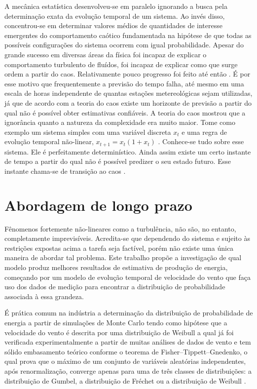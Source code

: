 \documentclass[
	12pt,				%
	openright,			%
	oneside,			%
	a4paper,			%
	english,			%
	french,				%
	spanish,			%
	brazil				%
	]{abntex2}
\begin{document}
A mecânica estatística desenvolveu-se em paralelo ignorando a busca pela determinação exata da evolução temporal de um sistema. Ao invés disso, concentrou-se em determinar valores médios de quantidades de interesse emergentes do comportamento caótico fundamentada na hipótese de que todas as possíveis configurações do sistema ocorrem com igual probabilidade. Apesar do grande sucesso em diversas áreas da física foi incapaz de explicar o comportamento turbulento de fluídos, foi incapaz de explicar como que surge ordem a partir do caos. Relativamente pouco progresso foi feito até então \cite{chaos}. É por esse motivo que frequentemente a previsão do tempo falha, até mesmo em uma escala de horas independente de quantas estações metereológicas sejam utilizadas, já que de acordo com a teoria do caos existe um horizonte de previsão \cite{ian} a partir do qual não é possível obter estimativas confiáveis. A teoria do caos mostrou que a ignorância quanto a natureza da complexidade era muito maior. Tome como exemplo um sistema simples com uma variável discreta $x_t$ e uma regra de evolução temporal não-linear, $x_{t+1}=x_t(1+x_t)$ \cite{NOSRATI2018224}. Conhece-se tudo sobre esse sistema. Ele é perfeitamente determinístico. Ainda assim existe um certo instante de tempo a partir do qual não é possível predizer o seu estado futuro. Esse instante chama-se de transição ao caos \cite{lorenz}.

\section{Abordagem de longo prazo}

Fênomenos fortemente não-lineares como a turbulência, não são, no entanto, completamente imprevisíveis. Acredita-se que dependendo do sistema e sujeito às restrições expostas acima a tarefa seja factível, porém não existe uma única maneira de abordar tal problema. Este trabalho propõe a investigação de qual modelo produz melhores resultados de estimativa de produção de energia, começando por um modelo de evolução temporal de velocidade do vento que faça uso dos dados de medição para encontrar a distribuição de probabilidade associada à essa grandeza.

É prática comum na indústria a determinação da distribuição de probabilidade de energia a partir de simulações de Monte Carlo \cite{portacopos} tendo como hipótese que a velocidade do vento é descrita por uma distribuição de Weibull a qual já foi verificada experimentalmente a partir de muitas análises de dados de vento e tem sólido embasamento teórico conforme o teorema de Fisher–Tippett–Gnedenko, o qual prova que o máximo de um conjunto de variáveis aleatórias independentes, após renormalização, converge apenas para uma de três classes de distribuições: a distribuição de Gumbel, a distribuição de Fréchet ou a distribuição de Weibull \cite{fisher}.
\end{document}

